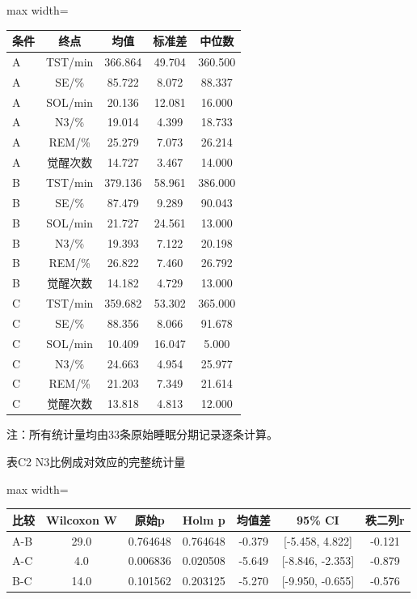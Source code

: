 \documentclass[UTF8,a4paper,12pt]{ctexart}
\begin{document}
\begin{table}[H]
\centering
\small
\begin{adjustbox}{max width=\textwidth}
\begin{tabular}{lcccc}
\toprule
条件 & 终点 & 均值 & 标准差 & 中位数 \\
\midrule
A & TST/min & 366.864 & 49.704 & 360.500 \\
A & SE/\% & 85.722 & 8.072 & 88.337 \\
A & SOL/min & 20.136 & 12.081 & 16.000 \\
A & N3/\% & 19.014 & 4.399 & 18.733 \\
A & REM/\% & 25.279 & 7.073 & 26.214 \\
A & 觉醒次数 & 14.727 & 3.467 & 14.000 \\
B & TST/min & 379.136 & 58.961 & 386.000 \\
B & SE/\% & 87.479 & 9.289 & 90.043 \\
B & SOL/min & 21.727 & 24.561 & 13.000 \\
B & N3/\% & 19.393 & 7.122 & 20.198 \\
B & REM/\% & 26.822 & 7.460 & 26.792 \\
B & 觉醒次数 & 14.182 & 4.729 & 13.000 \\
C & TST/min & 359.682 & 53.302 & 365.000 \\
C & SE/\% & 88.356 & 8.066 & 91.678 \\
C & SOL/min & 10.409 & 16.047 & 5.000 \\
C & N3/\% & 24.663 & 4.954 & 25.977 \\
C & REM/\% & 21.203 & 7.349 & 21.614 \\
C & 觉醒次数 & 13.818 & 4.813 & 12.000 \\
\bottomrule
\end{tabular}
\end{adjustbox}
\end{table}

注：所有统计量均由33条原始睡眠分期记录逐条计算。

表C2  N3比例成对效应的完整统计量

\begin{table}[H]
\centering
\small
\begin{adjustbox}{max width=\textwidth}
\begin{tabular}{lcccccc}
\toprule
比较 & Wilcoxon W & 原始p & Holm p & 均值差 & 95\% CI & 秩二列r \\
\midrule
A-B & 29.0 & 0.764648 & 0.764648 & -0.379 & [-5.458, 4.822] & -0.121 \\
A-C & 4.0 & 0.006836 & 0.020508 & -5.649 & [-8.846, -2.353] & -0.879 \\
B-C & 14.0 & 0.101562 & 0.203125 & -5.270 & [-9.950, -0.655] & -0.576 \\
\bottomrule
\end{tabular}
\end{adjustbox}
\end{table}
\end{document}

